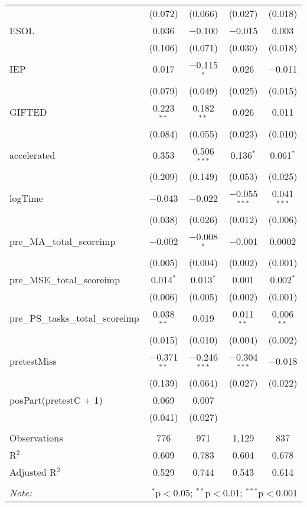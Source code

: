 \begin{table}[!htbp]
\begin{tabular}{@{\extracolsep{5pt}}lcccc}
  & (0.072) & (0.066) & (0.027) & (0.018) \\ 
 ESOL & 0.036 & $-$0.100 & $-$0.015 & 0.003 \\ 
  & (0.106) & (0.071) & (0.030) & (0.018) \\ 
 IEP & 0.017 & $-$0.115$^{*}$ & 0.026 & $-$0.011 \\ 
  & (0.079) & (0.049) & (0.025) & (0.015) \\ 
 GIFTED & 0.223$^{**}$ & 0.182$^{**}$ & 0.026 & 0.011 \\ 
  & (0.084) & (0.055) & (0.023) & (0.010) \\ 
 accelerated & 0.353 & 0.506$^{***}$ & 0.136$^{*}$ & 0.061$^{*}$ \\ 
  & (0.209) & (0.149) & (0.053) & (0.025) \\ 
 logTime & $-$0.043 & $-$0.022 & $-$0.055$^{***}$ & 0.041$^{***}$ \\ 
  & (0.038) & (0.026) & (0.012) & (0.006) \\ 
 pre\_MA\_total\_scoreimp & $-$0.002 & $-$0.008$^{*}$ & $-$0.001 & 0.0002 \\ 
  & (0.005) & (0.004) & (0.002) & (0.001) \\ 
 pre\_MSE\_total\_scoreimp & 0.014$^{*}$ & 0.013$^{*}$ & 0.001 & 0.002$^{*}$ \\ 
  & (0.006) & (0.005) & (0.002) & (0.001) \\ 
 pre\_PS\_tasks\_total\_scoreimp & 0.038$^{**}$ & 0.019 & 0.011$^{**}$ & 0.006$^{**}$ \\ 
  & (0.015) & (0.010) & (0.004) & (0.002) \\ 
 pretestMiss & $-$0.371$^{**}$ & $-$0.246$^{***}$ & $-$0.304$^{***}$ & $-$0.018 \\ 
  & (0.139) & (0.064) & (0.027) & (0.022) \\ 
 posPart(pretestC + 1) & 0.069 & 0.007 &  &  \\ 
  & (0.041) & (0.027) &  &  \\ 
\hline \\[-1.8ex] 
Observations & 776 & 971 & 1,129 & 837 \\ 
R$^{2}$ & 0.609 & 0.783 & 0.604 & 0.678 \\ 
Adjusted R$^{2}$ & 0.529 & 0.744 & 0.543 & 0.614 \\ 
\hline 
\hline \\[-1.8ex] 
\textit{Note:}  & \multicolumn{4}{r}{$^{*}$p$<$0.05; $^{**}$p$<$0.01; $^{***}$p$<$0.001} \\ 
\end{tabular} 
\end{table} 
